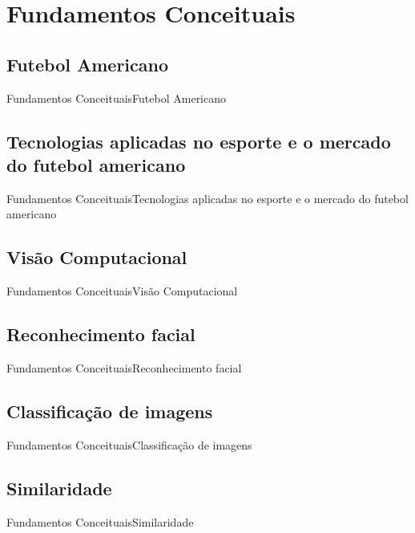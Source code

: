 \section{Fundamentos Conceituais}

\subsection{Futebol Americano}
\begin{frame}{Fundamentos Conceituais}{Futebol Americano}

\end{frame}

\subsection{Tecnologias aplicadas no esporte e o mercado do futebol americano}
\begin{frame}{Fundamentos Conceituais}{Tecnologias aplicadas no esporte e o mercado do futebol americano}

\end{frame}

\subsection{Visão Computacional}
\begin{frame}{Fundamentos Conceituais}{Visão Computacional}

\end{frame}

\subsection{Reconhecimento facial}
\begin{frame}{Fundamentos Conceituais}{Reconhecimento facial}

\end{frame}

\subsection{Classificação de imagens}
\begin{frame}{Fundamentos Conceituais}{Classificação de imagens}

\end{frame}

\subsection{Similaridade}
\begin{frame}{Fundamentos Conceituais}{Similaridade}

\end{frame}